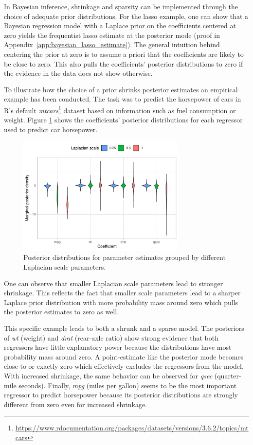 In Bayesian inference, shrinkage and sparsity can be implemented through the choice of adequate prior distributions. For the lasso example, one can show that a Bayesian regression model with a Laplace prior on the coefficients centered at zero yields the frequentist lasso estimate at the posterior mode (proof in Appendix~\ref{app:bayesian_lasso_estimate}). The general intuition behind centering the prior at zero is to assume a priori that the coefficients are likely to be close to zero. This also pulls the coefficients' posterior distributions to zero if the evidence in the data does not show otherwise.

To illustrate how the choice of a prior shrinks posterior estimates an empirical example has been conducted. The task was to predict the horsepower of cars in R's default \emph{mtcars}\footnote{\url{https://www.rdocumentation.org/packages/datasets/versions/3.6.2/topics/mtcars}} dataset based on information such as fuel consumption or weight. Figure \ref{fig:bayesian_lasso_parameters} shows the coefficients' posterior distributions for each regressor used to predict car horsepower.
\begin{figure}[h]
    \centering
    \includegraphics[width=0.75\textwidth]{figures/bayesian_lasso_parameters.pdf}
    \caption{Posterior distributions for parameter estimates grouped by different Laplacian scale parameters.}
    \label{fig:bayesian_lasso_parameters}
\end{figure}
One can observe that smaller Laplacian scale parameters lead to stronger shrinkage. This reflects the fact that smaller scale parameters lead to a sharper Laplace prior distribution with more probability mass around zero which pulls the posterior estimates to zero as well.

This specific example leads to both a shrunk and a sparse model. The posteriors of \emph{wt} (weight) and \emph{drat} (rear-axle ratio) show strong evidence that both regressors have little explanatory power because the distributions have most probability mass around zero. A point-estimate like the posterior mode becomes close to or exactly zero which effectively excludes the regressors from the model. With increased shrinkage, the same behavior can be observed for \emph{qsec} (quarter-mile seconds). Finally, \emph{mpg} (miles per gallon) seems to be the most important regressor to predict horsepower because its posterior distributions are strongly different from zero even for increased shrinkage.

